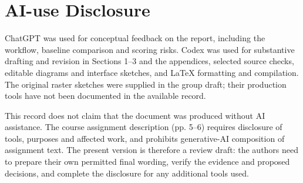 \documentclass[11pt,a4paper]{article}
\begin{document}
\section{AI-use Disclosure}
ChatGPT was used for conceptual feedback on the report, including the workflow, baseline comparison and scoring risks. Codex was used for substantive drafting and revision in Sections 1--3 and the appendices, selected source checks, editable diagrams and interface sketches, and LaTeX formatting and compilation. The original raster sketches were supplied in the group draft; their production tools have not been documented in the available record.

This record does not claim that the document was produced without AI assistance. The course assignment description (pp. 5--6) requires disclosure of tools, purposes and affected work, and prohibits generative-AI composition of assignment text. The present version is therefore a review draft: the authors need to prepare their own permitted final wording, verify the evidence and proposed decisions, and complete the disclosure for any additional tools used.
\end{document}
